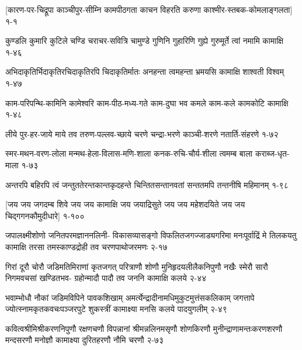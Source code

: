 \begingroup
\setmainfont[Script=Devanagari,Mapping=tex-text,Scale=0.96,FakeStretch=0.925]{Adobe Devanagari}
\setlength{\shlokaspaceskip}{10pt}
\annotwolineshloka
{[कारण-पर-चिद्रूपा काञ्चीपुर-सीम्नि कामपीठगता}
{काचन विहरति करुणा काश्मीर-स्तबक-कोमलाङ्गलता]}
{१-१}

\annotwolineshloka
{कुण्डलि कुमारि कुटिले चण्डि चराचर-सवित्रि चामुण्डे}
{गुणिनि गुहारिणि गुह्ये गुरुमूर्ते त्वां नमामि कामाक्षि}
{१-४६}

\annotwolineshloka
{अभिदाकृतिर्भिदाकृतिरचिदाकृतिरपि चिदाकृतिर्मातः}
{अनहन्ता त्वमहन्ता भ्रमयसि कामाक्षि शाश्वती विश्वम्}
{१-४७}

\annotwolineshloka
{काम-परिपन्थि-कामिनि कामेश्वरि काम-पीठ-मध्य-गते}
{काम-दुघा भव कमले काम-कले कामकोटि कामाक्षि}
{१-४८}

\annotwolineshloka
{लीये पुर-हर-जाये माये तव तरुण-पल्लव-च्छाये}
{चरणे चन्द्रा-भरणे काञ्ची-शरणे नतार्ति-संहरणे}
{१-७२}


\annotwolineshloka
{स्मर-मथन-वरण-लोला मन्मथ-हेला-विलास-मणि-शाला}
{कनक-रुचि-चौर्य-शीला त्वमम्ब बाला कराब्ज-धृत-माला}
{१-७३}

\annotwolineshloka
{अन्तरपि बहिरपि त्वं जन्तुततेरन्तकान्तकृदहन्ते}
{चिन्तितसन्तानवतां सन्ततमपि तन्तनीषि महिमानम्}
{१-९८}

\annofourlineindentedshloka
{[जय जय जगदम्ब शिवे}
{जय जय कामाक्षि जय जयाद्रिसुते}
{जय जय महेशदयिते}
{जय जय चिद्गगनकौमुदीधारे]}
{१-१००}





\annofourlineindentedshloka
{जपालक्ष्मीशोणो जनितपरमज्ञाननलिनी-}
{विकासव्यासङ्गो विफलितजगज्जाड्यगरिमा}
{मनःपूर्वाद्रिं मे तिलकयतु कामाक्षि तरसा}
{तमस्काण्डद्रोही तव चरणपाथोजरमणः}
{२-१७}

\annofourlineindentedshloka
{गिरां दूरौ चोरौ जडिमतिमिराणां कृतजगत्}
{परित्राणौ शोणौ मुनिहृदयलीलैकनिपुणौ}
{नखैः स्मेरौ सारौ निगमवचसां खण्डितभव-}
{ग्रहोन्मादौ पादौ तव जननि कामाक्षि कलये}
{२-४४}

\annofourlineindentedshloka
{भवाम्भोधौ नौकां जडिमविपिने पावकशिखाम्}
{अमर्त्येन्द्रादीनामधिमुकुटमुत्तंसकलिकाम्}
{जगत्तापे ज्योत्स्नामकृतकवचःपञ्जरपुटे}
{शुकस्त्रीं कामाक्ष्या मनसि कलये पादयुगलीम्}
{२-४९}

\annofourlineindentedshloka
{कवित्वश्रीमिश्रीकरणनिपुणौ रक्षणचणौ}
{विपन्नानां श्रीमन्नलिनमसृणौ शोणकिरणौ}
{मुनीन्द्राणामन्तःकरणशरणौ मन्दसरणौ}
{मनोज्ञौ कामाक्ष्या दुरितहरणौ नौमि चरणौ}
{२-७३}

